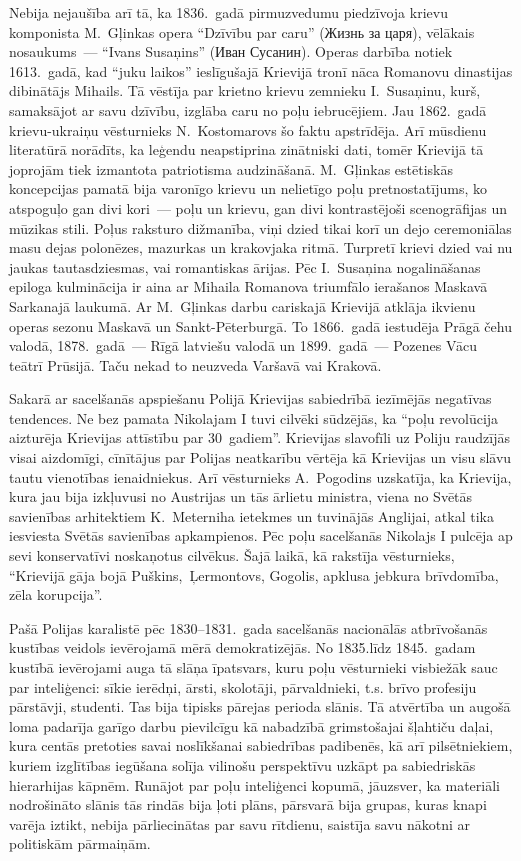 \documentclass[twoside,a5paper,12pt,fleqn,openany]{extbook}
\newcommand{\rutxti}[1]{\textrussian{#1}}
\begin{document}
Nebija nejaušība arī tā, ka 1836.~gadā pirmuzvedumu piedzīvoja krievu komponista M.~Gļinkas opera ``Dzīvību par caru'' (\rutxti{Жизнь за царя}), vēlākais nosaukums~--- ``Ivans Susaņins'' (\rutxti{Иван Сусанин}). Operas darbība notiek 1613.~gadā, kad ``juku laikos'' ieslīgušajā Krievijā tronī nāca Romanovu dinastijas dibinātājs Mihails. Tā vēstīja par krietno krievu zemnieku I.~Susaņinu, kurš, samaksājot ar savu dzīvību, izglāba caru no poļu iebrucējiem. Jau 1862.~gadā krievu-ukraiņu vēsturnieks N.~Kostomarovs šo faktu apstrīdēja. Arī mūsdienu literatūrā norādīts, ka leģendu neapstiprina zinātniski dati, tomēr Krievijā tā joprojām tiek izmantota patriotisma audzināšanā. M.~Gļinkas estētiskās koncepcijas pamatā bija varonīgo krievu un nelietīgo poļu pretnostatījums, ko atspoguļo gan divi kori~--- poļu un krievu, gan divi kontrastējoši scenogrāfijas un mūzikas stili. Poļus raksturo dižmanība, viņi dzied tikai korī un dejo ceremoniālas masu dejas polonēzes, mazurkas un krakovjaka ritmā. Turpretī krievi dzied vai nu jaukas tautasdziesmas, vai romantiskas ārijas. Pēc I.~Susaņina nogalināšanas epiloga kulminācija ir aina ar Mihaila Romanova triumfālo ierašanos Maskavā Sarkanajā laukumā. Ar M.~Gļinkas darbu cariskajā Krievijā atklāja ikvienu operas sezonu Maskavā un Sankt-Pēterburgā. To 1866.~gadā iestudēja Prāgā čehu valodā, 1878.~gadā~--- Rīgā latviešu valodā un 1899.~gadā~--- Pozenes Vācu teātrī Prūsijā. Taču nekad to neuzveda Varšavā vai Krakovā.

Sakarā ar sacelšanās apspiešanu Polijā Krievijas sabiedrībā iezīmējās negatīvas tendences. Ne bez pamata Nikolajam I tuvi cilvēki sūdzējās, ka ``poļu revolūcija aizturēja Krievijas attīstību par 30~gadiem''. Krievijas slavofīli uz Poliju raudzījās visai aizdomīgi, cīnītājus par Polijas neatkarību vērtēja kā Krievijas un visu slāvu tautu vienotības ienaidniekus. Arī vēsturnieks A.~Pogodins uzskatīja, ka Krievija, kura jau bija izkļuvusi no Austrijas un tās ārlietu ministra, viena no Svētās savienības arhitektiem K.~Meterniha ietekmes un tuvinājās Anglijai, atkal tika iesviesta Svētās savienības apkampienos. Pēc poļu sacelšanās Nikolajs I pulcēja ap sevi konservatīvi noskaņotus cilvēkus. Šajā laikā, kā rakstīja vēsturnieks, ``Krievijā gāja bojā Puškins,~Ļermontovs, Gogolis, apklusa jebkura brīvdomība, zēla korupcija''.

Pašā Polijas karalistē pēc 1830--1831.~gada sacelšanās nacionālās atbrīvošanās kustības veidols ievērojamā mērā demokratizējās. No 1835.līdz 1845.~gadam kustībā ievērojami auga tā slāņa īpatsvars, kuru poļu vēsturnieki visbiežāk sauc par inteliģenci: sīkie ierēdņi, ārsti, skolotāji, pārvaldnieki, t.s. brīvo profesiju pārstāvji, studenti. Tas bija tipisks pārejas perioda slānis. Tā atvērtība un augošā loma padarīja garīgo darbu pievilcīgu kā nabadzībā grimstošajai šļahtiču daļai, kura centās pretoties savai noslīkšanai sabiedrības padibenēs, kā arī pilsētniekiem, kuriem izglītības iegūšana solīja vilinošu perspektīvu uzkāpt pa sabiedriskās hierarhijas kāpnēm. Runājot par poļu inteliģenci kopumā, jāuzsver, ka materiāli nodrošināto slānis tās rindās bija ļoti plāns, pārsvarā bija grupas, kuras knapi varēja iztikt, nebija pārliecinātas par savu rītdienu, saistīja savu nākotni ar politiskām pārmaiņām.
\end{document}
